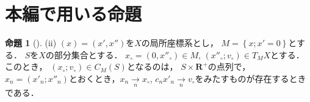 \documentclass[leqno, 10pt, a4paper, dvipdfmx]{jsarticle}
\theoremstyle{definition}
\newcommand{\rr}{\mathbf{R}}
\numberwithin{equation}{section}
\newcommand{\rrp}{\rr^{+}} %
\theoremstyle{mystyle}
\newtheorem{PRP}[AXM]{命題}
\renewenvironment{leftbar}{%
  \def\FrameCommand{\textcolor{lightgray}{\vrule width 4pt} \hspace{10pt}}%
  \MakeFramed {\advance\hsize-\width \FrameRestore}}%
{\endMakeFramed}
\newcommand{\norb}[2][]{T_{#1}{#2}}
\newcommand{\wncone}[1][]{C_{#1}} %
\begin{document}
\section*{本編で用いる命題}
\begin{leftbar}
\begin{PRP}[{\cite[Prop. 4.1.2]{KS90}}]\label{prp4.1.2}
    (ii) 
    \((x)=(x',x'')\)を\(X\)の局所座標系とし，
    \(M=\left\{x;x'=0\right\}\)とする．
    \(S\)を\(X\)の部分集合とする．
    \(x_{\circ}=(0,x''_{\circ})\in M\), 
    \((x''_{\circ};v_{\circ})\in \norb[M]{X}\)とする．
    このとき，
    \((x_{\circ};v_{\circ})\in\wncone[M](S)\)となるのは，
    \(S\times \rrp\)の点列で，\(x_n=(x'_n;x''_n)\)とおくとき，\(x_n\underset{n}{\to}x_{\circ}\), \(c_nx'_n\underset{n}{\to}v_\circ\)をみたすものが存在するときである．
\end{PRP}
\end{leftbar}
\end{document}
